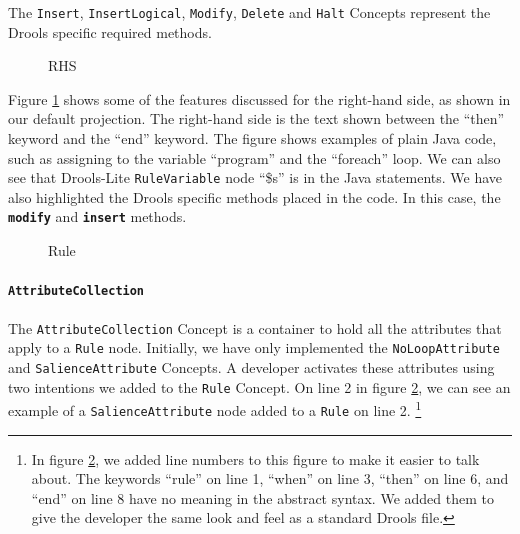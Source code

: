 The \texttt{Insert}, \texttt{InsertLogical}, \texttt{Modify}, \texttt{Delete} and \texttt{Halt} Concepts represent the Drools specific required methods.

\begin{figure}[h]
    \centering
    \caption{RHS}
    \label{fig:RHS}
\end{figure}

Figure \ref{fig:RHS} shows some of the features discussed for the right-hand side, as shown in our default projection.
The right-hand side is the text shown between the ``then'' keyword and the ``end'' keyword.
The figure shows examples of plain Java code, such as assigning to the variable ``program'' and the ``foreach'' loop.
We can also see that Drools-Lite \texttt{RuleVariable} node ``\$s'' is in the Java statements.
We have also highlighted the Drools specific methods placed in the code.
In this case, the \texttt{\textbf{modify}} and \texttt{\textbf{insert}} methods.   

\begin{figure}[h]
    \centering
    \caption{Rule}
    \label{fig:Rule}
\end{figure}

\paragraph{\texttt{AttributeCollection}} The \texttt{AttributeCollection} Concept is a container to hold all the attributes that apply to a \texttt{Rule} node.
Initially, we have only implemented the \texttt{NoLoopAttribute} and \texttt{SalienceAttribute} Concepts.
A developer activates these attributes using two intentions we added to the \texttt{Rule} Concept.
On line 2 in figure \ref{fig:Rule}, we can see an example of a \texttt{SalienceAttribute} node added to a \texttt{Rule} on line 2.
\footnote{In figure \ref{fig:Rule}, we added line numbers to this figure to make it easier to talk about.
The keywords ``rule'' on line 1, ``when'' on line 3, ``then'' on line 6, and ``end'' on line 8 have no meaning in the abstract syntax.
We added them to give the developer the same look and feel as a standard Drools file.}

